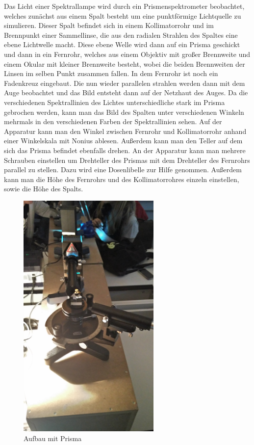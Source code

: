 \documentclass[a4paper, 11pt]{article}
\begin{document}
Das Licht einer Spektrallampe wird durch ein Prismenspektrometer beobachtet, welches zunächst aus einem Spalt besteht um eine punktförmige Lichtquelle zu simulieren. Dieser Spalt befindet sich in einem Kollimatorrohr und im Brennpunkt einer Sammellinse, die aus den radialen Strahlen des Spaltes eine ebene Lichtwelle macht. Diese ebene Welle wird dann auf ein Prisma geschickt und dann in ein Fernrohr, welches aus einem Objektiv mit großer Brennweite und einem Okular mit kleiner Brennweite besteht, wobei die beiden Brennweiten der Linsen im selben Punkt zusammen fallen. In dem Fernrohr ist noch ein Fadenkreuz eingebaut.
Die nun wieder parallelen strahlen werden dann mit dem Auge beobachtet und das Bild entsteht dann auf der Netzhaut des Auges.
Da die verschiedenen Spektrallinien des Lichtes unterschiedliche stark im Prisma gebrochen werden, kann man das Bild des Spalten unter verschiedenen Winkeln mehrmals in den verschiedenen Farben der Spektrallinien sehen.
Auf der Apparatur kann man den Winkel zwischen Fernrohr und Kollimatorrohr anhand einer Winkelskala mit Nonius ablesen. Außerdem kann man den Teller auf dem sich das Prisma befindet ebenfalls drehen.
An der Apparatur kann man mehrere Schrauben einstellen um Drehteller des Prismas mit dem Drehteller des Fernrohrs parallel zu stellen.
Dazu wird eine Dosenlibelle zur Hilfe genommen.
Außerdem kann man die Höhe des Fernrohrs und des Kollimatorrohres einzeln einstellen, sowie die Höhe des Spalts.

\begin{figure}[H]
	\centering
	\includegraphics[trim = 0mm 15cm 0mm 20cm,clip, width=7cm]{Bilder/IMG_20170915_131253.jpg}%
	\caption[Aufbau mit Prisma]{Aufbau mit Prisma}%
	\label{pic:Abbildung 1}%
\end{figure}
\end{document}
